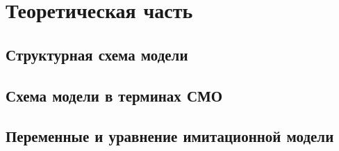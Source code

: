 \chapter{Теоретическая часть}

\section{Структурная схема модели}

\section{Схема модели в терминах СМО}

\section{Переменные и уравнение имитационной модели}

